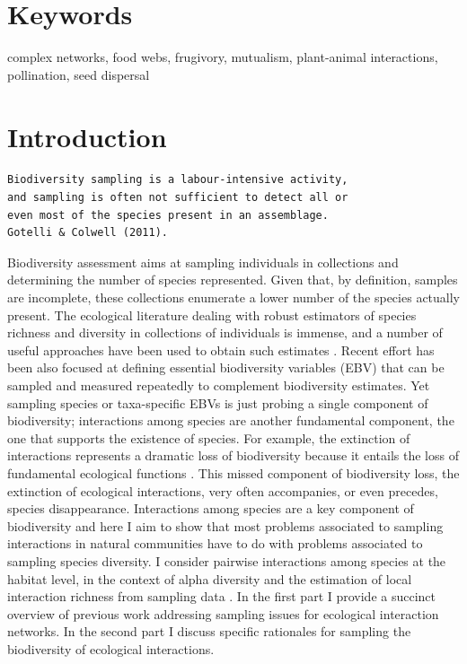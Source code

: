 \documentclass[12pt]{article}
\begin{document}
\section*{Keywords}
complex networks, food webs, frugivory, mutualism, plant-animal interactions, pollination, seed dispersal
\section*{Introduction}
\label{introduction}
\begin{verbatim}
Biodiversity sampling is a labour-intensive activity,   
and sampling is often not sufficient to detect all or   
even most of the species present in an assemblage.   
Gotelli & Colwell (2011).
\end{verbatim}

\linenumbers
Biodiversity assessment aims at sampling individuals in collections and determining the number of species represented. Given that, by definition, samples are incomplete, these collections enumerate a lower number of the species actually present. The ecological literature dealing with robust estimators of species richness and diversity in collections of individuals is immense, and a number of useful approaches have been used to obtain such estimates \citep{Magurran:1988mm,Gotelli:2001uo,Hortal:2006dc,Colwell:2009gv,Gotelli:2011tb}. Recent effort has been also focused at defining essential biodiversity variables (EBV) \citep{Pereira:2013ji} that can be sampled and measured repeatedly to complement biodiversity estimates. Yet sampling species or taxa-specific EBVs is just probing a single component of biodiversity; interactions among species are another fundamental component, the one that supports the existence of species. For example, the extinction of interactions represents a dramatic loss of biodiversity because it entails the loss of fundamental ecological functions \citep{ValienteBanuet:2014bw}. This missed component of biodiversity loss, the extinction of ecological interactions, very often accompanies, or even precedes, species disappearance. Interactions among species are a key component of biodiversity and here I aim to show that most problems associated to sampling interactions in natural communities have to do with problems associated to sampling species diversity. I consider pairwise interactions among species at the habitat level, in the context of alpha diversity and the estimation of local interaction richness from sampling data \citep{Mao:2005tka}. In the first part I provide a succinct overview of previous work addressing sampling issues for ecological interaction networks. In the second part I discuss specific rationales for sampling the biodiversity of ecological interactions. 
\end{document}
